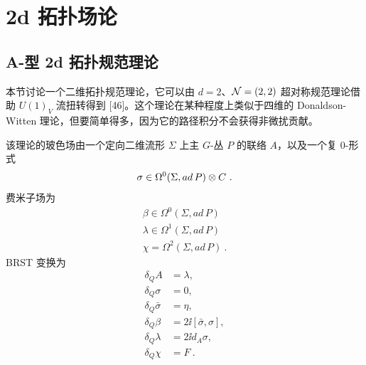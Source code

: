 \chapter{2d 拓扑场论}

\section{A-型 2d 拓扑规范理论}

本节讨论一个二维拓扑规范理论，它可以由 $d=2$、$\mathcal{N}=(2,2)$ 超对称规范理论借助 $U(1)_V$ 流扭转得到 [46]。这个理论在某种程度上类似于四维的 Donaldson-Witten 理论，但要简单得多，因为它的路径积分不会获得非微扰贡献。


该理论的玻色场由一个定向二维流形 $\Sigma$ 上主 $G$-丛 $P$ 的联络 $A$，以及一个复 0-形式
\[ \sigma \in \Omega^0(\Sigma, ad\,P)\otimes C \ . \]
费米子场为
\begin{gather*}
\beta \in \Omega^0(\Sigma, ad\,P) \\
\lambda \in \Omega^1(\Sigma, ad\,P) \\
\chi = \Omega^2(\Sigma, ad\,P) \ .
\end{gather*}
BRST 变换为
\begin{align*}
\delta_QA &= \lambda, \\
\delta_Q\sigma &= 0, \\
\delta_Q\bar\sigma &= \eta, \\
\delta_Q\beta &= 2\ii[\bar\sigma,\sigma], \\
\delta_Q\lambda &= 2\ii d_A\sigma, \\
\delta_Q\chi &= F \ .
\end{align*}


